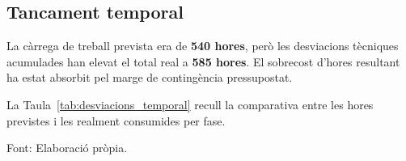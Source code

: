 \subsection{Tancament temporal}
La càrrega de treball prevista era de \textbf{540 hores}, però les desviacions tècniques acumulades han elevat el total real a \textbf{585 hores}. El sobrecost d'hores resultant ha estat absorbit pel marge de contingència pressupostat.

La Taula~\ref{tab:desviacions_temporal} recull la comparativa entre les hores previstes i les realment consumides per fase.

\begin{table}[htbp]
  \centering
  \caption{Comparativa de la planificació temporal prevista enfront del temps real d'execució.}
  \label{tab:desviacions_temporal}
  \par\smallskip
  \small Font: Elaboració pròpia.
\end{table}

